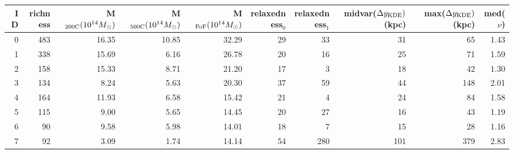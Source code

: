 \begin{tabular}{rrrrrrrrrr}
\toprule
ID & richness & M$_{\rm 200C} (10^{14} M_\odot)$ & M$_{\rm 500C} (10^{14} M_\odot)$ & M$_{\rm FoF} (10^{14} M_\odot)$  & relaxedness$_0$ & relaxedness$_1$ & midvar($\Delta y_{\rm KDE})$ (kpc) & max($\Delta y_{\rm KDE})$ (kpc) & med($\nu$) \\
\midrule
 0 &      483 &                            16.35 &                            10.85 &                            32.29 &              29 &              33 &                                 31 &                              65 &       1.43 \\
 1 &      338 &                            15.69 &                             6.16 &                            26.78 &              20 &              16 &                                 25 &                              71 &       1.59 \\
 2 &      158 &                            15.33 &                             8.71 &                            21.20 &              17 &               3 &                                 18 &                              42 &       1.30 \\
 3 &      134 &                             8.24 &                             5.63 &                            20.30 &              37 &              59 &                                 44 &                             148 &       2.01 \\
 4 &      164 &                            11.93 &                             6.58 &                            15.42 &              21 &               4 &                                 24 &                              84 &       1.58 \\
 5 &      115 &                             9.00 &                             5.65 &                            14.45 &              20 &              27 &                                 16 &                              43 &       1.19 \\
 6 &       90 &                             9.58 &                             5.98 &                            14.01 &              18 &               7 &                                 15 &                              28 &       1.16 \\
 7 &       92 &                             3.09 &                             1.74 &                            14.14 &              54 &             280 &                                101 &                             379 &       2.83 \\

\end{tabular}
